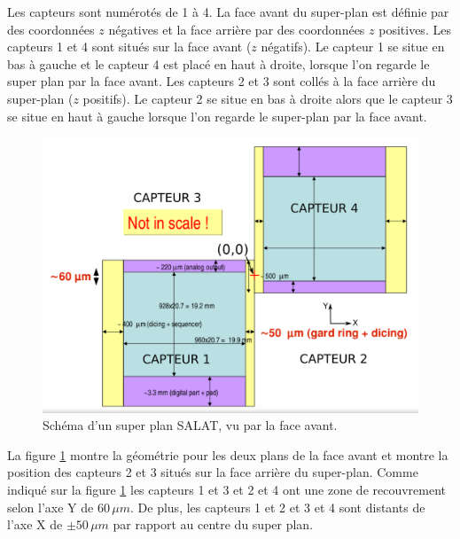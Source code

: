    \medskip
   
   Les capteurs sont num\'erot\'es de 1 \`a 4. La face avant du super-plan est d\'efinie par des coordonn\'ees $z$ n\'egatives et la face arri\`ere par des coordonn\'ees $z$ positives. Les capteurs 1 et 4 sont situ\'es sur la face avant ($z$ n\'egatifs). Le capteur 1 se situe en bas \`a gauche et le capteur 4 est plac\'e en haut \`a droite, lorsque l'on regarde le super plan par la face avant. Les capteurs 2 et 3 sont coll\'es \`a la face arri\`ere du super-plan ($z$ positifs). Le capteur 2 se situe en bas \`a droite alors que le capteur 3 se situe en haut \`a gauche lorsque l'on regarde le super-plan par la face avant.
    
    \begin{figure}[!htb]
     \begin{center} 
      \includegraphics[scale=0.30]{./figures/SALAT_schema.png}
      \caption{Schéma d'un super plan SALAT, vu par la face avant.}
      \label{fig:coordCapteurSALAT0}
      \end{center}
    \end{figure} 
  
  \medskip
    
   La figure \ref{fig:coordCapteurSALAT0} montre la g\'eom\'etrie pour les deux plans de la face avant et montre la position des capteurs 2 et 3 situ\'es sur la face arri\`ere du super-plan. Comme indiqu\'e sur la figure \ref{fig:coordCapteurSALAT0} les capteurs 1 et 3 et 2 et 4 ont une zone de recouvrement selon l'axe Y de $60 \, \mu m$. De plus, les capteurs 1 et 2 et 3 et 4 sont distants de l'axe X de $\pm 50 \, \mu m$ par rapport au centre du super plan. 
   
